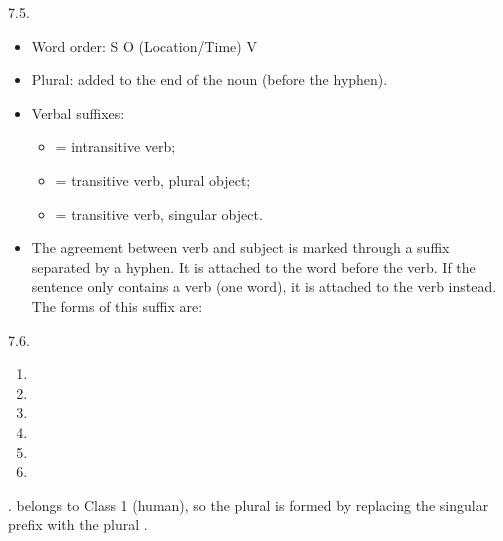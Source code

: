\begin{refsection}
\begin{practiceproblemsolution}{7.5. \langnameMundari}
\begin{itemize}
    \item Word order: S O (Location/Time) V
    \item Plural:  added to the end of the noun (before the hyphen).
    \item Verbal suffixes:
    \begin{itemize}
        \item {} = intransitive verb;
		\item {} = transitive verb, plural object;
		\item {} = transitive verb, singular object.
	\end{itemize}
 \item The agreement between verb and subject is marked through a suffix separated by a hyphen. It is attached to the word before the verb. If the sentence only contains a verb (one word), it is attached to the verb instead. The forms of this suffix are:
 \begin{itemize}
\end{itemize}
\end{itemize}
\end{practiceproblemsolution}

\begin{practiceproblemsolution}{7.6. \langnameSwahili}

\begin{solutions}[label=Solution 7.6\alph*]
    \item
    \begin{enumerate}[start = 13]

        \item {}
        \item {}
        \item {}
        \item {}
        \item {}
        \item {}
    \end{enumerate}
    \item {}.  belongs to Class 1 (human), so the plural is formed by replacing the singular prefix  with the plural .
\end{solutions}


\end{practiceproblemsolution}
\end{refsection}
